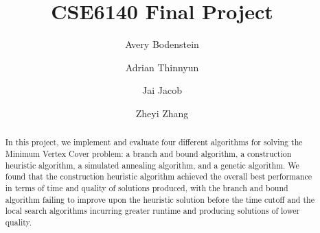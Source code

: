 \documentclass[acmlarge]{acmart}
\begin{document}
\title{CSE6140 Final Project}

\author{Avery Bodenstein}

\author{Adrian Thinnyun}
\authornotemark[1]

\author{Jai Jacob}
\authornotemark[1]

\author{Zheyi Zhang}
\authornotemark[1]


\begin{abstract}
  In this project, we implement and evaluate four different algorithms for solving the Minimum Vertex Cover problem: a branch and bound algorithm, a construction heuristic algorithm, a simulated annealing algorithm, and a genetic algorithm. We found that the construction heuristic algorithm achieved the overall best performance in terms of time and quality of solutions produced, with the branch and bound algorithm failing to improve upon the heuristic solution before the time cutoff and the local search algorithms incurring greater runtime and producing solutions of lower quality.
\end{abstract}
\end{document}
